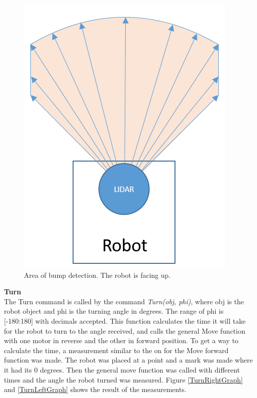 \begin{figure}[H]
\centering
\includegraphics[scale=1]{billeder/MotionBumper.png}
\caption{Area of bump detection. The robot is facing up.}\label{MotionBumper}
\end{figure} 

\textbf{Turn}\\
The Turn command is called by the command \textit{Turn(obj, phi)}, where obj is the robot object and phi is the turning angle in degrees. The range of phi is [-180:180] with decimals accepted. This function calculates the time it will take for the robot to turn to the angle received, and calls the general Move function with one motor in reverse and the other in forward position. 
To get a way to calculate the time, a measurement similar to the on for the Move forward function was made. The robot was placed at a point and a mark was made where it had its 0 degrees. Then the general move function was called with different times and the angle the robot turned was measured. Figure \ref{TurnRightGraph} and \ref{TurnLeftGraph} shows the result of the measurements.

